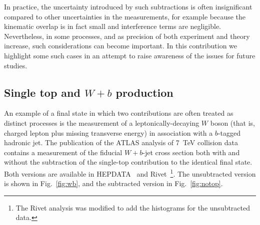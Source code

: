 \documentclass[11pt]{cernrep}
\begin{document}
In practice, the uncertainty introduced by such subtractions is often insignificant compared to other uncertainties in the measurements, 
for example because the kinematic overlap
is in fact small and interference terms are negligible. Nevertheless, in some processes, and as precision of both experiment
and theory increase, such considerations can become important. In this contribution we highlight some such cases in an attempt 
to raise awareness of the issues for future studies. 

\subsection{Single top and $W+b$ production}

An example of a final state in which two contributions are often treated as distinct processes is the measurement of a 
leptonically-decaying $W$ boson (that is, charged lepton plus missing transverse energy) in association with a $b$-tagged hadronic jet. 
The publication of the ATLAS analysis of 7~TeV collision data\cite{Aad:2013vka} contains a measurement of the fiducial $W+b$-jet 
cross section both with and without the subtraction of the single-top contribution to the identical final state. Both
versions are available in HEPDATA~\cite{hepdata} and Rivet~\cite{Buckley:2010ar}\footnote{The Rivet analysis was modified to add the histograms 
for the unsubtracted data.}. 
The unsubtracted version is shown in Fig.~\ref{fig:wb}, and the subtracted version in Fig.~\ref{fig:notop}. 
\end{document}
